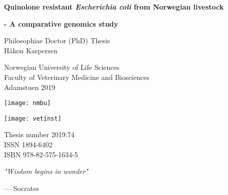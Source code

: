 \frontmatter
{}
{
\pagestyle{empty}
\graphicspath{ {./images/pdfs/} }
\begin{titlepage}
   \begin{center}
       
       \huge
       
       \textbf{Quinolone resistant \textit{Escherichia coli} from Norwegian livestock}
       
       \LARGE
       
       \textbf{- A comparative genomics study}
 
       \vspace{1cm}
       
       \large
       Philosophiae Doctor (PhD) Thesis\\
       Håkon Kaspersen
 
       \vspace{1.5cm}
       
       Norwegian University of Life Sciences\\
       Faculty of Veterinary Medicine and Biosciences\\
       Adamstuen 2019
       
       \texttt{[image: nmbu]}
       
       \texttt{[image: vetinst]}
       
       \vfill

 
       \vspace{0.5cm}
       \normalsize
 
       Thesis number 2019:74\\
       ISSN 1894-6402\\
       ISBN 978-82-575-1634-5
 
   \end{center}
\end{titlepage}

\begin{titlepage}
   \null
   \vspace*{\fill}
   \renewcommand{\epigraphsize}{\large}
   \epigraph{\textit{"Wisdom begins in wonder"}}{--- \textup{Socrates}}
\end{titlepage}
}